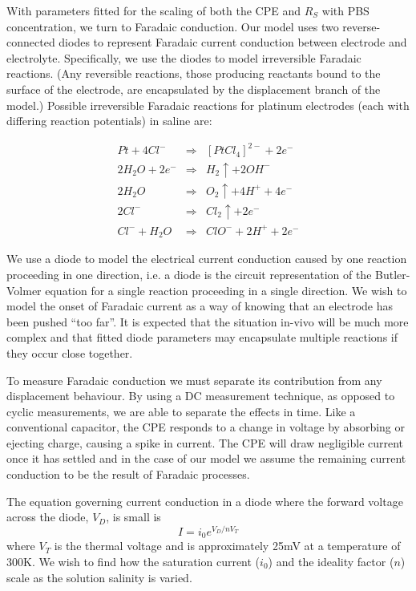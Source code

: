 \documentclass[journal, a4paper]{IEEEtran}
\begin{document}
With parameters fitted for the scaling of both the CPE and $R_{S}$ with PBS concentration, we turn to Faradaic conduction.
Our model uses two reverse-connected diodes to represent Faradaic current conduction between electrode and electrolyte. Specifically, we use the diodes to model irreversible Faradaic reactions. (Any reversible reactions, those producing reactants bound to the surface of the electrode, are encapsulated by the displacement branch of the model.)
Possible irreversible Faradaic reactions for platinum electrodes {\color{blue}(each with differing reaction potentials)} in saline are:

\begin{align}
    Pt + 4Cl^{-} &\Rightarrow& [PtCl_{4}]^{2-} + 2 e^{-} \label{eqn:ptCl}\\
    2H_{2}O + 2 e^{-} &\Rightarrow& H_{2}\uparrow + 2OH^{-} \label{eqn:H20}\\
    2H_{2}O &\Rightarrow& O_{2}\uparrow + 4H^{+} + 4e^{-} \label{eqn:2H20}\\
    2Cl^{-} &\Rightarrow& Cl_{2}\uparrow + 2e^{-} \label{eqn:Cl} \\
    Cl^{-} + H_{2}O &\Rightarrow& ClO^{-} + 2H^{+} + 2e^{-} \label{eqn:ClH20}
\end{align}

{
    \color{blue}
We use a diode to model the electrical current conduction caused by one reaction proceeding in one direction, i.e. a diode is the circuit representation of the Butler-Volmer equation for a single reaction proceeding in a single direction. 
    We wish to model the onset of Faradaic current as a way of knowing that an electrode has been pushed ``too far''. It is expected that the situation in-vivo will be much more complex and that fitted diode parameters may encapsulate multiple reactions if they occur close together.
}

{\color{blue} To measure Faradaic conduction we must separate its contribution from any displacement behaviour.} By using a DC measurement technique, as opposed to cyclic measurements, we are able to separate the effects in time.
Like a conventional capacitor, the CPE responds {\color{blue} to a change in voltage by absorbing or ejecting charge, causing a spike in current}. The CPE will draw negligible current once it has settled and in the case of our model we assume the remaining current conduction to be the result of Faradaic processes.

The equation governing current conduction in a diode where the forward voltage across the diode, $V_{D}$, is small is
\begin{equation}
    I = i_{0}  e^{V_{D} / n V_{T}}
\end{equation}
where $V_{T}$ is the thermal voltage and is approximately 25\thinspace mV at a temperature of 300\thinspace K. We wish to find how the saturation current ($i_{0}$) and the ideality factor ($n$) scale as the solution salinity is varied.
\end{document}
